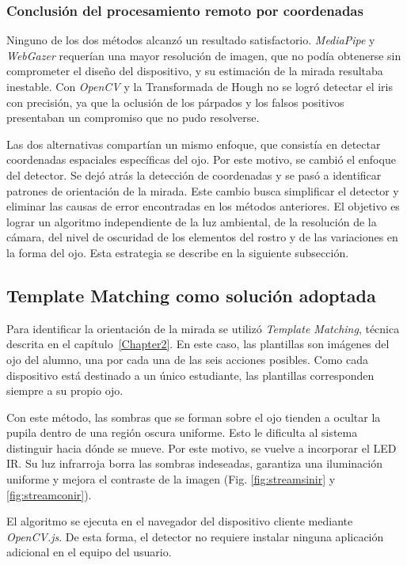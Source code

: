 \subsubsection{Conclusión del procesamiento remoto por coordenadas}

Ninguno de los dos métodos alcanzó un resultado satisfactorio. \emph{MediaPipe} y \emph{WebGazer} requerían una mayor resolución de imagen, que no podía obtenerse sin comprometer el diseño del dispositivo, y su estimación de la mirada resultaba inestable. Con \emph{OpenCV} y la Transformada de Hough no se logró detectar el iris con precisión, ya que la oclusión de los párpados y los falsos positivos presentaban un compromiso que no pudo resolverse.

Las dos alternativas compartían un mismo enfoque, que consistía en detectar coordenadas espaciales específicas del ojo. Por este motivo, se cambió el enfoque del detector. Se dejó atrás la detección de coordenadas y se pasó a identificar patrones de orientación de la mirada. Este cambio busca simplificar el detector y eliminar las causas de error encontradas en los métodos anteriores. El objetivo es lograr un algoritmo independiente de la luz ambiental, de la resolución de la cámara, del nivel de oscuridad de los elementos del rostro y de las variaciones en la forma del ojo. Esta estrategia se describe en la siguiente subsección.

\subsection{Template Matching como solución adoptada}
\label{sec:template_matching}

Para identificar la orientación de la mirada se utilizó \emph{Template Matching}, técnica descrita en el capítulo~\ref{Chapter2}. En este caso, las plantillas son imágenes del ojo del alumno, una por cada una de las seis acciones posibles. Como cada dispositivo está destinado a un único estudiante, las plantillas corresponden siempre a su propio ojo.

Con este método, las sombras que se forman sobre el ojo tienden a ocultar la pupila dentro de una región oscura uniforme. Esto le dificulta al sistema distinguir hacia dónde se mueve. Por este motivo, se vuelve a incorporar el LED IR. Su luz infrarroja borra las sombras indeseadas, garantiza una iluminación uniforme y mejora el contraste de la imagen (Fig. \ref{fig:streamsinir} y \ref{fig:streamconir}).

El algoritmo se ejecuta en el navegador del dispositivo cliente mediante \emph{OpenCV.js}. De esta forma, el detector no requiere instalar ninguna aplicación adicional en el equipo del usuario.

